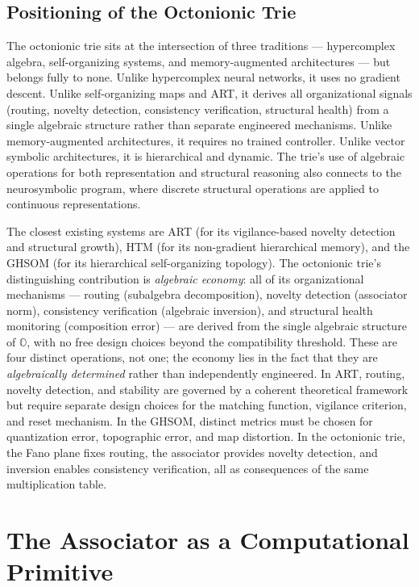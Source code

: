 \documentclass[11pt,a4paper]{article}
\theoremstyle{definition}
\theoremstyle{remark}
\newcommand{\Oct}{\mathbb{O}}
\begin{document}
\subsection{Positioning of the Octonionic Trie}

The octonionic trie sits at the intersection of three traditions --- hypercomplex algebra, self-organizing systems, and memory-augmented architectures --- but belongs fully to none. Unlike hypercomplex neural networks, it uses no gradient descent. Unlike self-organizing maps and ART, it derives all organizational signals (routing, novelty detection, consistency verification, structural health) from a single algebraic structure rather than separate engineered mechanisms. Unlike memory-augmented architectures, it requires no trained controller. Unlike vector symbolic architectures, it is hierarchical and dynamic. The trie's use of algebraic operations for both representation and structural reasoning also connects to the neurosymbolic program, where discrete structural operations are applied to continuous representations.

The closest existing systems are ART (for its vigilance-based novelty detection and structural growth), HTM (for its non-gradient hierarchical memory), and the GHSOM (for its hierarchical self-organizing topology). The octonionic trie's distinguishing contribution is \emph{algebraic economy}: all of its organizational mechanisms --- routing (subalgebra decomposition), novelty detection (associator norm), consistency verification (algebraic inversion), and structural health monitoring (composition error) --- are derived from the single algebraic structure of $\Oct$, with no free design choices beyond the compatibility threshold. These are four distinct operations, not one; the economy lies in the fact that they are \emph{algebraically determined} rather than independently engineered. In ART, routing, novelty detection, and stability are governed by a coherent theoretical framework but require separate design choices for the matching function, vigilance criterion, and reset mechanism. In the GHSOM, distinct metrics must be chosen for quantization error, topographic error, and map distortion. In the octonionic trie, the Fano plane fixes routing, the associator provides novelty detection, and inversion enables consistency verification, all as consequences of the same multiplication table.


\section{The Associator as a Computational Primitive}
\label{sec:associator}
\end{document}

